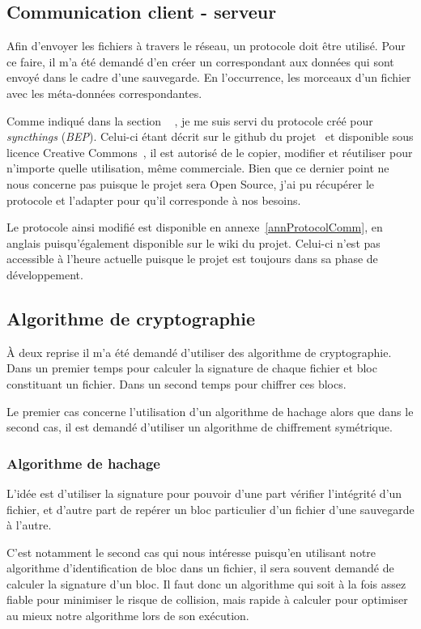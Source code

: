 \documentclass[a4paper,10pt, twoside]{report}
\begin{document}
\begin{spacing}{1.2}
\subsection{Communication client - serveur}
Afin d'envoyer les fichiers à travers le réseau, un protocole doit être
utilisé. Pour ce faire, il m'a été demandé d'en créer un correspondant
aux données qui sont envoyé dans le cadre d'une sauvegarde. En l'occurrence,
les morceaux d'un fichier avec les méta-données correspondantes.

Comme indiqué dans la section \flqq~ \frqq, je me
suis servi du protocole créé pour \textit{syncthings} (\textit{BEP}).
Celui-ci étant décrit sur le github du projet~\cite{refBEP} et
disponible sous licence Creative Commons~\cite{refCC4.0}, il est autorisé de
le copier, modifier et réutiliser pour n'importe quelle utilisation, même
commerciale. Bien que ce dernier point ne nous concerne pas puisque le projet
sera Open Source, j'ai pu récupérer le protocole et l'adapter pour qu'il
corresponde à nos besoins.

Le protocole ainsi modifié est disponible en annexe~\ref{annProtocolComm}, en
anglais puisqu'également disponible sur le wiki du projet. Celui-ci n'est pas
accessible à l'heure actuelle puisque le projet est toujours dans sa phase de
développement.

\subsection{Algorithme de cryptographie}
À deux reprise il m'a été demandé d'utiliser des algorithme de
cryptographie. Dans un premier temps pour calculer la signature de chaque
fichier et bloc constituant un fichier. Dans un second temps pour chiffrer
ces blocs.

Le premier cas concerne l'utilisation d'un algorithme de hachage alors que dans
le second cas, il est demandé d'utiliser un algorithme de chiffrement
symétrique.

\subsubsection{Algorithme de hachage}
L'idée est d'utiliser la signature pour pouvoir d'une part vérifier
l'intégrité d'un fichier, et d'autre part de repérer un bloc particulier d'un
fichier d'une sauvegarde à l'autre.

C'est notamment le second cas qui nous intéresse puisqu'en utilisant notre
algorithme d'identification de bloc dans un fichier, il sera souvent demandé
de calculer la signature d'un bloc. Il faut donc un algorithme qui soit à la
fois assez fiable pour minimiser le risque de collision, mais rapide à
calculer pour optimiser au mieux notre algorithme lors de son exécution.


\end{spacing}
\end{document}
